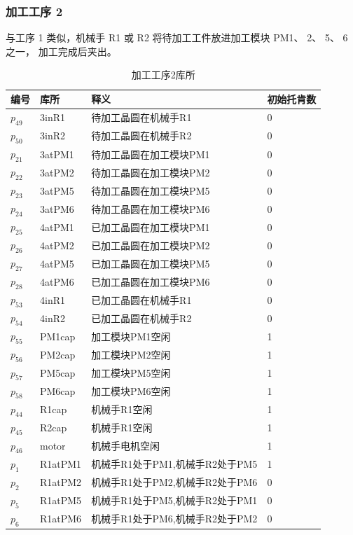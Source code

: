 \subsubsection{加工工序 2}
与工序 1 类似，机械手 R1 或 R2 将待加工工件放进加工模块 PM1、 2、 5、 6 之一，
加工完成后夹出。

\begin{table}[H]
	\centering
	\caption{加工工序2库所}
	\begin{tabular}{llll}
		\toprule
		编号 & 库所    & 释义                            & 初始托肯数 \\
		\hline
		$p_{49}$  & 3inR1   & 待加工晶圆在机械手R1            & 0          \\
		$p_{50}$  & 3inR2   & 待加工晶圆在机械手R2            & 0          \\
		$p_{21}$  & 3atPM1  & 待加工晶圆在加工模块PM1         & 0          \\
		$p_{22}$  & 3atPM2  & 待加工晶圆在加工模块PM2         & 0          \\
		$p_{23}$  & 3atPM5  & 待加工晶圆在加工模块PM5         & 0          \\
		$p_{24}$  & 3atPM6  & 待加工晶圆在加工模块PM6         & 0          \\
		$p_{25}$  & 4atPM1  & 已加工晶圆在加工模块PM1         & 0          \\
		$p_{26}$  & 4atPM2  & 已加工晶圆在加工模块PM2         & 0          \\
		$p_{27}$  & 4atPM5  & 已加工晶圆在加工模块PM5         & 0          \\
		$p_{28}$  & 4atPM6  & 已加工晶圆在加工模块PM6         & 0          \\
		$p_{53}$  & 4inR1   & 已加工晶圆在机械手R1            & 0          \\
		$p_{54}$  & 4inR2   & 已加工晶圆在机械手R2            & 0          \\
		$p_{55}$  & PM1cap  & 加工模块PM1空闲                 & 1          \\
		$p_{56}$  & PM2cap  & 加工模块PM2空闲                 & 1          \\
		$p_{57}$  & PM5cap  & 加工模块PM5空闲                 & 1          \\
		$p_{58}$  & PM6cap  & 加工模块PM6空闲                 & 1          \\
		$p_{44}$  & R1cap   & 机械手R1空闲                    & 1          \\
		$p_{45}$  & R2cap   & 机械手R1空闲                    & 1          \\
		$p_{46}$  & motor   & 机械手电机空闲                  & 1          \\
		$p_{1}$   & R1atPM1 & 机械手R1处于PM1,机械手R2处于PM5 & 1          \\
		$p_{2}$   & R1atPM2 & 机械手R1处于PM2,机械手R2处于PM6 & 0          \\
		$p_{5}$   & R1atPM5 & 机械手R1处于PM5,机械手R2处于PM1 & 0          \\
		$p_{6}$   & R1atPM6 & 机械手R1处于PM6,机械手R2处于PM2 & 0          \\
		\bottomrule
	\end{tabular}
\end{table}

